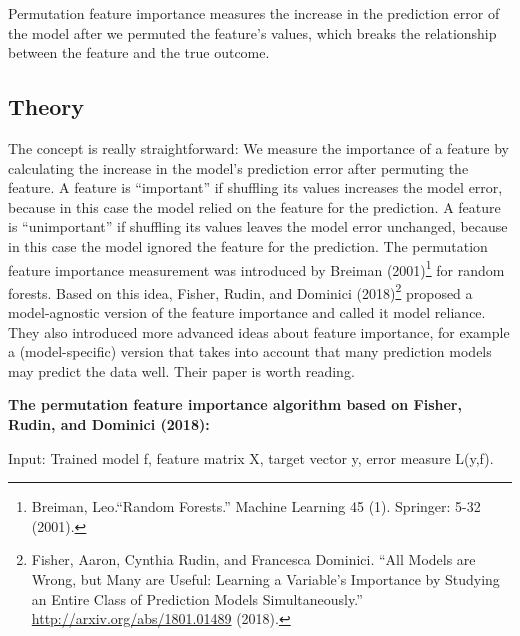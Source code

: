 \documentclass[12pt,]{krantz}
\begin{document}
Permutation feature importance measures the increase in the prediction
error of the model after we permuted the feature's values, which breaks
the relationship between the feature and the true outcome.

\subsection{Theory}\label{theory-3}

The concept is really straightforward: We measure the importance of a
feature by calculating the increase in the model's prediction error
after permuting the feature. A feature is ``important'' if shuffling its
values increases the model error, because in this case the model relied
on the feature for the prediction. A feature is ``unimportant'' if
shuffling its values leaves the model error unchanged, because in this
case the model ignored the feature for the prediction. The permutation
feature importance measurement was introduced by Breiman
(2001)\footnote{Breiman, Leo.``Random Forests.'' Machine Learning 45
  (1). Springer: 5-32 (2001).} for random forests. Based on this idea,
Fisher, Rudin, and Dominici (2018)\footnote{Fisher, Aaron, Cynthia
  Rudin, and Francesca Dominici. ``All Models are Wrong, but Many are
  Useful: Learning a Variable's Importance by Studying an Entire Class
  of Prediction Models Simultaneously.''
  \url{http://arxiv.org/abs/1801.01489} (2018).} proposed a
model-agnostic version of the feature importance and called it model
reliance. They also introduced more advanced ideas about feature
importance, for example a (model-specific) version that takes into
account that many prediction models may predict the data well. Their
paper is worth reading.

\textbf{The permutation feature importance algorithm based on Fisher,
Rudin, and Dominici (2018):}

Input: Trained model f, feature matrix X, target vector y, error measure
L(y,f).
\end{document}
